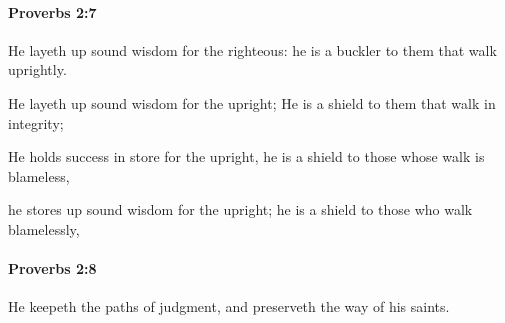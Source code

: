		\paragraph{Proverbs 2:7} %
			\label{PROVERBS-2-7}

			He layeth up sound wisdom for the righteous: he is a buckler to them that walk uprightly.

			\begin{versebox}
					\item[BHS] 
					\item[ASV] He layeth up sound wisdom for the upright; He is a shield to them that walk in integrity;
					\item[NIV] He holds success in store for the upright, he is a shield to those whose walk is blameless,
					\item[NRSV] he stores up sound wisdom for the upright; he is a shield to those who walk blamelessly,
			\end{versebox}

		\paragraph{Proverbs 2:8} %
			\label{PROVERBS-2-8}

			He keepeth the paths of judgment, and preserveth the way of his saints.

